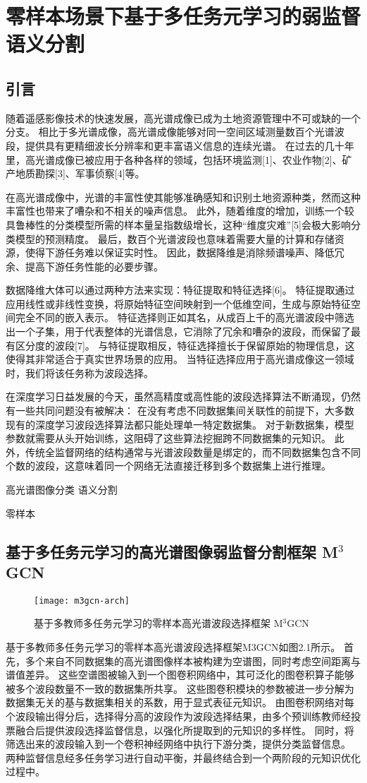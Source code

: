\chapter{零样本场景下基于多任务元学习的弱监督语义分割}
\section{引言}
随着遥感影像技术的快速发展，高光谱成像已成为土地资源管理中不可或缺的一个分支。
相比于多光谱成像，高光谱成像能够对同一空间区域测量数百个光谱波段，提供具有更精细波长分辨率和更丰富语义信息的连续光谱。
在过去的几十年里，高光谱成像已被应用于各种各样的领域，包括环境监测[1]、农业作物[2]、矿产地质勘探[3]、军事侦察[4]等。
\par
在高光谱成像中，光谱的丰富性使其能够准确感知和识别土地资源种类，然而这种丰富性也带来了嘈杂和不相关的噪声信息。
此外，随着维度的增加，训练一个较具鲁棒性的分类模型所需的样本量呈指数级增长，这种“维度灾难”[5]会极大影响分类模型的预测精度。
最后，数百个光谱波段也意味着需要大量的计算和存储资源，使得下游任务难以保证实时性。
因此，数据降维是消除频谱噪声、降低冗余、提高下游任务性能的必要步骤。
\par
数据降维大体可以通过两种方法来实现：特征提取和特征选择[6]。
特征提取通过应用线性或非线性变换，将原始特征空间映射到一个低维空间，生成与原始特征空间完全不同的嵌入表示。
特征选择则正如其名，从成百上千的高光谱波段中筛选出一个子集，用于代表整体的光谱信息，它消除了冗余和嘈杂的波段，而保留了最有区分度的波段[7]。
与特征提取相反，特征选择擅长于保留原始的物理信息，这使得其非常适合于真实世界场景的应用。
当特征选择应用于高光谱成像这一领域时，我们将该任务称为波段选择。
\par
在深度学习日益发展的今天，虽然高精度或高性能的波段选择算法不断涌现，仍然有一些共同问题没有被解决：
在没有考虑不同数据集间关联性的前提下，大多数现有的深度学习波段选择算法都只能处理单一特定数据集。
对于新数据集，模型参数就需要从头开始训练，这阻碍了这些算法挖掘跨不同数据集的元知识。
此外，传统全监督网络的结构通常与光谱波段数量是绑定的，而不同数据集包含不同个数的波段，这意味着同一个网络无法直接迁移到多个数据集上进行推理。
\par
高光谱图像分类 \rightarrow 语义分割
\par
零样本
\section{基于多任务元学习的高光谱图像弱监督分割框架 M$^3$GCN}
\begin{figure}[h]
\centering
\texttt{[image: m3gcn-arch]}
\caption{基于多教师多任务元学习的零样本高光谱波段选择框架 M$^3$GCN}
\label{fig:m3gcn-arch}
\end{figure}
基于多教师多任务元学习的零样本高光谱波段选择框架M3GCN如图2.1所示。
首先，多个来自不同数据集的高光谱图像样本被构建为空谱图，同时考虑空间距离与谱值差异。
这些空谱图被输入到一个图卷积网络中，其可泛化的图卷积算子能够被多个波段数量不一致的数据集所共享。
这些图卷积模块的参数被进一步分解为数据集无关的基与数据集相关的系数，用于显式表征元知识。
由图卷积网络对每个波段输出得分后，选择得分高的波段作为波段选择结果，由多个预训练教师经投票融合后提供波段选择监督信息，以强化所提取到的元知识的多样性。
同时，将筛选出来的波段输入到一个卷积神经网络中执行下游分类，提供分类监督信息。
两种监督信息经多任务学习进行自动平衡，并最终结合到一个两阶段的元知识优化过程中。
